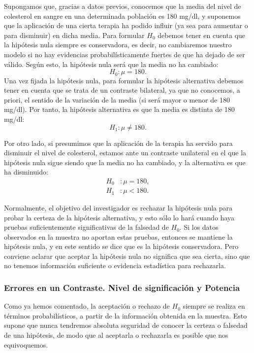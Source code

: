 \begin{ejemplo}
Supongamos que, gracias a datos previos, conocemos que la media del nivel de colesterol en sangre en una determinada
población es 180 mg/dl, y suponemos que la aplicación de una cierta terapia ha podido influir (ya sea para aumentar o
para disminuir) en dicha media.
Para formular $H_0$ debemos tener en cuenta que la hipótesis nula siempre es conservadora, es decir, no cambiaremos
nuestro modelo si no hay evidencias probabilísticamente fuertes de que ha dejado de ser válido.
Según esto, la hipótesis nula será que la media no ha cambiado:
\[
H_0: \mu = 180.
\]
Una vez fijada la hipótesis nula, para formular la hipótesis alternativa debemos tener en cuenta que se trata de un
contraste bilateral, ya que no conocemos, a priori, el sentido de la variación de la media (si será mayor o menor de 180
mg/dl).
Por tanto, la hipótesis alternativa es que la media es distinta de 180 mg/dl:
\[H_1: \mu \neq 180.\]

Por otro lado, si presumimos que la aplicación de la terapia ha servido para disminuir el nivel de colesterol, estamos
ante un contraste unilateral en el que la hipótesis nula sigue siendo que la media no ha cambiado, y la alternativa es
que ha disminuido:
\begin{align*}
H_0 &: \mu = 180,\\
H_1 &: \mu < 180.
\end{align*}
\end{ejemplo}

Normalmente, el objetivo del investigador es rechazar la hipótesis nula para probar la certeza de la hipótesis
alternativa, y esto sólo lo hará cuando haya pruebas suficientemente significativas de la falsedad de $H_0$.
Si los datos observados en la muestra no aportan estas pruebas, entonces se mantiene la hipótesis nula, y en este
sentido se dice que es la hipótesis conservadora.
Pero conviene aclarar que aceptar la hipótesis nula no significa que sea cierta, sino que no tenemos información
suficiente o evidencia estadística para rechazarla.


\subsubsection{Errores en un Contraste. Nivel de significación y Potencia}
Como ya hemos comentado, la aceptación o rechazo de $H_0$ siempre se realiza en términos probabilísticos, a partir de la
información obtenida en la muestra.
Esto supone que nunca tendremos absoluta seguridad de conocer la certeza o falsedad de una hipótesis, de modo que al
aceptarla o rechazarla es posible que nos equivoquemos.

